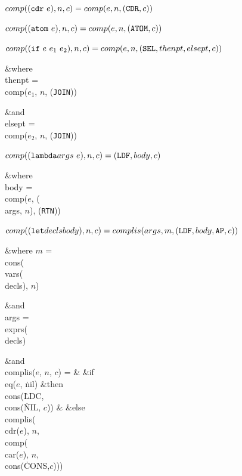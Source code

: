 \bull $\\{comp}(({\tt cdr}~e),n,c) = \\{comp}(e,n,({\tt CDR}, c))$

\bull $\\{comp}(({\tt atom}~e),n,c) = \\{comp}(e,n,({\tt ATOM}, c))$

\bull $\\{comp}(({\tt if}~e~e_{1}~e_{2}),n,c) = \\{comp}(e,n,({\tt SEL},%
\\{thenpt},\\{elsept},c))$

\&{where} \\{thenpt} = \\{comp}($e_{1}$, $n$, ({\tt JOIN}))

\&{and} \\{elsept} = \\{comp}($e_{2}$, $n$, ({\tt JOIN}))

\bull $\\{comp}(({\tt lambda}~\\{args}~e),n,c) = ({\tt LDF}, \\{body}, c)$

\&{where} \\{body} = \\{comp}($e$, (\\{args}, $n$), ({\tt RTN}))

\bull $\\{comp}(({\tt let}~\\{decls}~\\{body}),n,c) = \\{complis}(\\{args},m,({%
\tt LDF}, \\{body}, {\tt AP}, c))$

\&{where} $m$ = \\{cons}(\\{vars}(\\{decls}), $n$)

\&{and} \\{args} = \\{exprs}(\\{decls})

\vbox{\+\indent\&{and} \\{complis}($e$, $n$, $c$) = \cleartabs & \&{if} %
\\{eq}($e$, \.{nil}) \&{then} \\{cons}(\.{LDC}, \\{cons}(\.{NIL}, $c$))\cr
\+& \&{else} \\{complis}(\\{cdr}($e$), $n$, \\{comp}(\\{car}($e$), $n$, %
\\{cons}(\.{CONS},$c$)))\cr}

